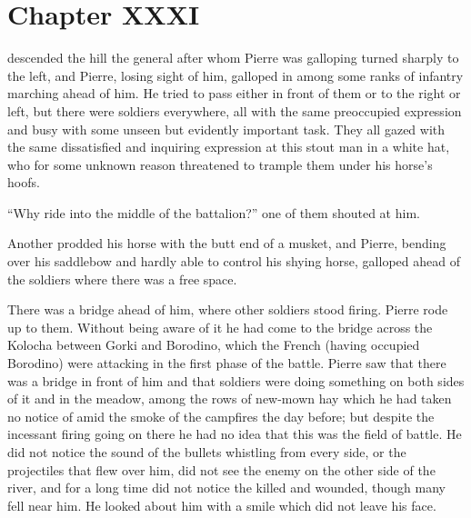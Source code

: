 
\chapter*{Chapter XXXI} \ifaudio {}
\fi

 descended the hill the general after whom Pierre was
galloping turned sharply to the left, and Pierre, losing sight of
him, galloped in among some ranks of infantry marching ahead of
him. He tried to pass either in front of them or to the right or
left, but there were soldiers everywhere, all with the same
preoccupied expression and busy with some unseen but evidently
important task. They all gazed with the same dissatisfied and
inquiring expression at this stout man in a white hat, who for
some unknown reason threatened to trample them under his horse's
hoofs.

``Why ride into the middle of the battalion?'' one of them
shouted at him.

Another prodded his horse with the butt end of a musket, and
Pierre, bending over his saddlebow and hardly able to control his
shying horse, galloped ahead of the soldiers where there was a
free space.

There was a bridge ahead of him, where other soldiers stood
firing.  Pierre rode up to them. Without being aware of it he had
come to the bridge across the Kolocha between Gorki and Borodino,
which the French (having occupied Borodino) were attacking in the
first phase of the battle. Pierre saw that there was a bridge in
front of him and that soldiers were doing something on both sides
of it and in the meadow, among the rows of new-mown hay which he
had taken no notice of amid the smoke of the campfires the day
before; but despite the incessant firing going on there he had no
idea that this was the field of battle. He did not notice the
sound of the bullets whistling from every side, or the
projectiles that flew over him, did not see the enemy on the
other side of the river, and for a long time did not notice the
killed and wounded, though many fell near him. He looked about
him with a smile which did not leave his face.

